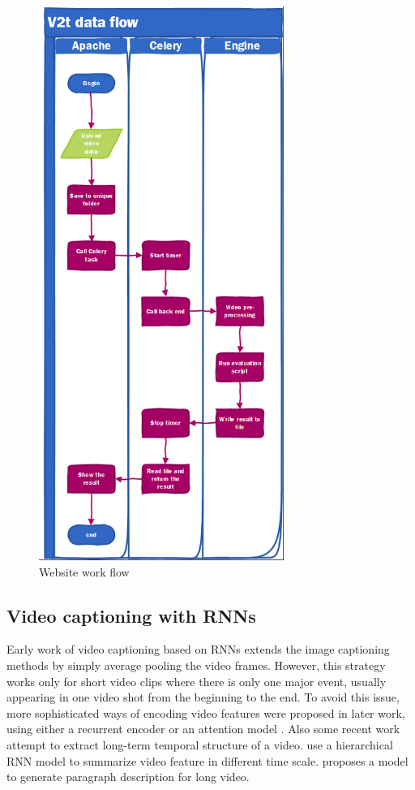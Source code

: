 \begin{figure}[htbp]
\centering
\includegraphics[width=8cm]{resources/web.png}
\caption{Website work flow}
\label{fig:web}
\end{figure}

\subsection{Video captioning with RNNs}
Early work of video captioning \cite{venugopalan2014translating} based on RNNs extends the image captioning methods by simply average pooling the video frames. However, this strategy works only for short video clips where there is only one major event, usually appearing in one video shot from the beginning to the end. To avoid this issue, more sophisticated ways of encoding video features were proposed in later work, using either a recurrent encoder \cite{donahue2015long,venugopalan2015sequence,xu2015multi} or an attention model \cite{yao2015describing}. Also some recent work attempt to extract long-term temporal structure of a video. \cite{pan2015hierarchical} use a hierarchical RNN model to summarize video feature in different time scale. \cite{yu2015video} proposes a model to generate paragraph description for long video.

